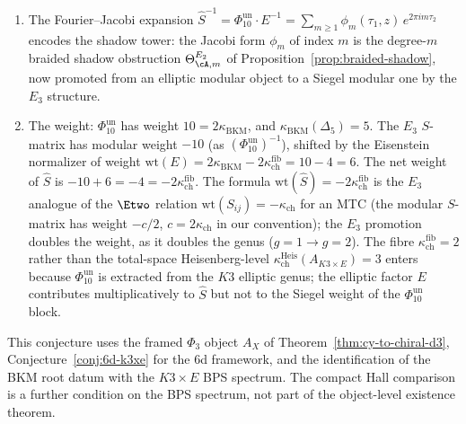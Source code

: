 \begin{conjecture}
\begin{enumerate}[label=\textup{(\roman*)}]
 $\mathrm{wt}(\hat{S}) = -10 + 6 = -2\kappa_{\mathrm{ch}}^{\mathrm{fib}}$,
 where $\kappa_{\mathrm{ch}}^{\mathrm{fib}} := \kappa_{\mathrm{ch}}(\Phi_2(D^b(K3))) = 2$
 is the $K3$-\emph{fibre} algebraization invariant controlling the
 $K3$ elliptic genus that feeds the Borcherds lift. The total-space
 Heisenberg-level invariant $\kappa_{\mathrm{ch}}^{\mathrm{Heis}}(A_{K3 \times E}) = 3$ under K\"unneth
 additivity does not enter the Siegel weight, because $\Phi_{10}^{\mathrm{un}}$ is
 the Borcherds lift of the $K3$ elliptic genus alone (fibre data, not
 total-space data); cf.\ Remark~\ref{rem:beauville-kappa-formula-subscript-split}.
 \item The Fourier--Jacobi expansion
 $\hat{S}^{-1} = \Phi_{10}^{\mathrm{un}} \cdot E^{-1}
 = \sum_{m \geq 1} \phi_m(\tau_1, z)\, e^{2\pi i m \tau_2}$
 encodes the shadow tower: the Jacobi form $\phi_m$ of index $m$
 is the degree-$m$ braided shadow obstruction
 $\Theta^{E_2}_{\cA, m}$ of
 Proposition~\textup{\ref{prop:braided-shadow}}, now promoted from
 an elliptic modular object to a Siegel modular one by the
 $E_3$ structure.
 \item The weight: $\Phi_{10}^{\mathrm{un}}$ has weight $10 = 2\kappa_{\mathrm{BKM}}$,
 and $\kappa_{\mathrm{BKM}}(\Delta_5) = 5$. The $E_3$ $S$-matrix has
 modular weight $-10$ (as $(\Phi_{10}^{\mathrm{un}})^{-1}$), shifted by the
 Eisenstein normalizer of weight
 $\mathrm{wt}(E) = 2\kappa_{\mathrm{BKM}} - 2\kappa_{\mathrm{ch}}^{\mathrm{fib}}
 = 10 - 4 = 6$. The net weight of $\hat{S}$ is
 $-10 + 6 = -4 = -2\kappa_{\mathrm{ch}}^{\mathrm{fib}}$.
 The formula $\mathrm{wt}(\hat{S}) = -2\kappa_{\mathrm{ch}}^{\mathrm{fib}}$
 is the $E_3$ analogue of the $\Etwo$ relation
 $\mathrm{wt}(S_{ij}) = -\kappa_{\mathrm{ch}}$ for an MTC (the
 modular $S$-matrix has weight $-c/2$, $c = 2\kappa_{\mathrm{ch}}$
 in our convention); the $E_3$ promotion doubles the weight, as
 it doubles the genus ($g = 1 \to g = 2$). The fibre $\kappa_{\mathrm{ch}}^{\mathrm{fib}} = 2$
 rather than the total-space Heisenberg-level $\kappa_{\mathrm{ch}}^{\mathrm{Heis}}(A_{K3 \times E}) = 3$
 enters because $\Phi_{10}^{\mathrm{un}}$ is extracted from the $K3$ elliptic
 genus; the elliptic factor $E$ contributes multiplicatively to
 $\hat S$ but not to the Siegel weight of the $\Phi_{10}^{\mathrm{un}}$ block.
\end{enumerate}
This conjecture uses the framed $\Phi_3$ object
$A_X$ of Theorem~\textup{\ref{thm:cy-to-chiral-d3}},
Conjecture~\textup{\ref{conj:6d-k3xe}} for the 6d framework, and the
identification of the BKM root datum with the $K3 \times E$ BPS spectrum.
The compact Hall comparison is a further condition on the BPS spectrum,
not part of the object-level existence theorem.
\end{conjecture}

